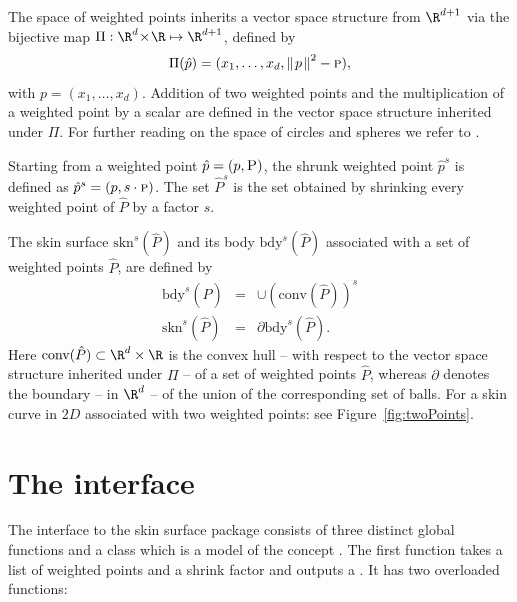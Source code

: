 The space of weighted points inherits a vector space structure from
$\R^{d+1}$ via the bijective map
$\Pi:\R^d\!\times\!\R\mapsto\R^{d+1}$, defined by 
%
\[
\Pi(\hat{p}) = (x_1,\ldots,x_d,{\parallel\! {p} \!\parallel}^2-\textsc{p}),
\]
%
with ${p}=(x_1,\ldots,x_d)$. Addition of two weighted points and the
multiplication of a weighted point by a scalar are defined in the
vector space structure inherited under $\Pi$. For further reading on
the space of circles and spheres we refer to \cite{p-gcc-70}.

Starting from a weighted point $\hat{p}=({p},\textsc{P})$, the
shrunk weighted point $\hat{p}^s$ is defined as $\hat{p}^s =
({p},s\cdot \textsc{p})$.  The set $\hat{P}^s$ is the set
obtained by shrinking every weighted point of $\hat{P}$ by a
factor $s$.

The skin surface $\mbox{skn}^{s}(\hat{P})$ and its body
$\mbox{bdy}^{s}(\hat{P})$ associated with a set of weighted points
$\hat{P}$, are defined by
\begin{eqnarray}
  \label{eq:defbody}
  \mbox{bdy}^{s}(\hat{P}) &=& \cup(\mbox{conv} (\hat{P}))^s\\
  \label{eq:defskin}
  \mbox{skn}^{s}(\hat{P}) &=& \partial{\mbox{bdy}^{s}(\hat{P})}.
\end{eqnarray}
%
Here $\mbox{conv}(\hat{P}) \subset \R^d\times\R$ is the convex hull --
with respect to the vector space structure inherited under $\Pi$ -- of
a set of weighted points $\hat{P}$, whereas $\partial$ denotes the
boundary -- in $\R^d$ -- of the union of the corresponding set of
balls. For a skin curve in $2D$ associated with two weighted points:
see Figure~\ref{fig:twoPoints}.


\section{The interface}
The interface to the skin surface package consists of three distinct
global functions and a class  which is a model of
the concept .  The first function takes a list of
weighted points and a shrink factor and outputs a
. It has two overloaded functions:


